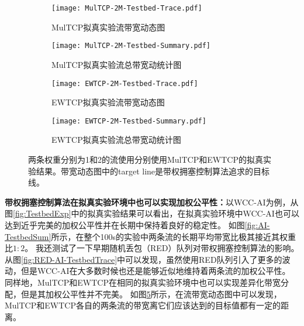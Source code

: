 \documentclass[winfonts]{njuthesis}
\begin{document}
\begin{figure}
  \begin{subfigure}{.5\textwidth}
    \centering
		\texttt{[image: MulTCP-2M-Testbed-Trace.pdf]}
    \label{fig:MulTCP-2M-TestbedTrace}
    \caption{MulTCP拟真实验流带宽动态图}
  \end{subfigure}
	\begin{subfigure}{.5\textwidth}
    \centering
		\texttt{[image: MulTCP-2M-Testbed-Summary.pdf]}
    \label{fig:MulTCP-2M-TestbedSum}
    \caption{MulTCP拟真实验流总带宽动统计图}
  \end{subfigure}
  \begin{subfigure}{.5\textwidth}
    \centering
		\texttt{[image: EWTCP-2M-Testbed-Trace.pdf]}
    \label{fig:EWTCP-2M-TestbedTrace}
    \caption{EWTCP拟真实验流带宽动态图}
  \end{subfigure}
	\begin{subfigure}{.5\textwidth}
    \centering
		\texttt{[image: EWTCP-2M-Testbed-Summary.pdf]}
    \label{fig:EWTCP-2M-TestbedSum}
    \caption{EWTCP拟真实验流总带宽动统计图}
  \end{subfigure}
  \label{fig:PreWorkTrace}
  \caption{两条权重分别为1和2的流使用分别使用MulTCP和EWTCP的拟真实验结果。带宽动态图中的target line是带权拥塞控制算法追求的目标线。}
\end{figure}

\textbf{带权拥塞控制算法在拟真实验环境中也可以实现加权公平性：}以WCC-AI为例，从图\ref{fig:TestbedExp}中的拟真实验结果可以看出，在拟真实验环境中WCC-AI也可以达到近乎完美的加权公平性并在长期中保持着良好的稳定性。
如图\ref{fig:AI-TestbedSum}所示，在整个100s的实验中两条流的长期平均带宽比极其接近其权重比$1:2$。
我还测试了一下早期随机丢包（RED）队列对带权拥塞控制算法的影响。
从图\ref{fig:RED-AI-TestbedTrace}中可以发现，虽然使用RED队列引入了更多的波动，但是WCC-AI在大多数时候也还是能够近似地维持着两条流的加权公平性。
同样地，MulTCP和EWTCP在相同的拟真实验环境中也可以实现差异化带宽分配，但是其加权公平性并不完美。
如图\ref{fig:PreWorkTrace}所示，在流带宽动态图中可以发现，MulTCP和EWTCP各自的两条流的带宽离它们应该达到的目标值都有一定的距离。
\end{document}

